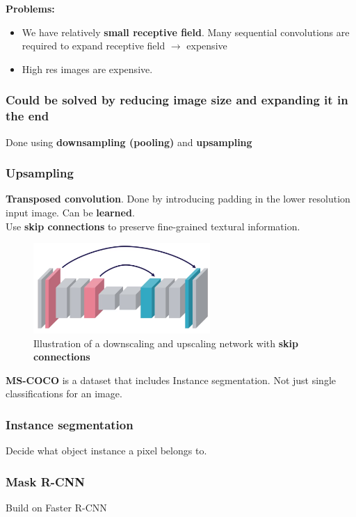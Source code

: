 \documentclass[a4paper]{article}
\begin{document}
\textbf{Problems:} 
\begin{itemize}
	\item We have relatively \textbf{small receptive field}. Many sequential convolutions are required to expand receptive field $ \rightarrow $ expensive 
	\item High res images are expensive. 
\end{itemize}

\subsubsection*{Could be solved by reducing image size and expanding it in the end}
Done using \textbf{downsampling (pooling)} and \textbf{upsampling} 

\subsubsection*{Upsampling}
\textbf{Transposed convolution}. Done by introducing padding in the lower resolution input image. Can be \textbf{learned}. \\
Use \textbf{skip connections} to preserve fine-grained textural information.  
\begin{figure}[H]
\centering
\includegraphics[width=0.6\textwidth]{figures/Downsampling_upsampling.png}
\caption{Illustration of a downscaling and upscaling network with \textbf{skip connections}}
\label{fig:down_up}
\end{figure} 



\textbf{MS-COCO} is a dataset that includes Instance segmentation. Not just single classifications for an image. 


\subsubsection{Instance segmentation}
Decide what object instance a pixel belongs to.

\subsubsection*{Mask R-CNN}
Build on Faster R-CNN
\end{document}

